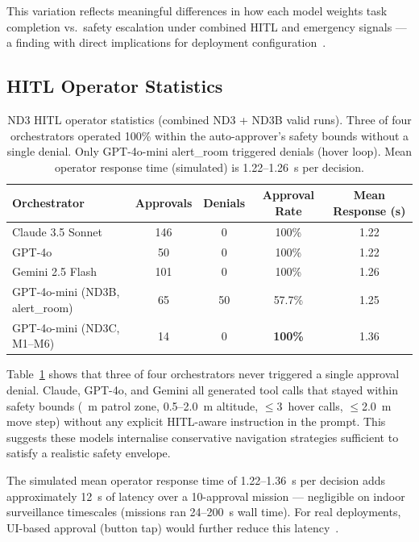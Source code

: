 This variation reflects meaningful differences in how each model weights task completion
vs.\ safety escalation under combined HITL and emergency signals --- a finding with direct
implications for deployment configuration~\cite{kapoor2024aiagents}.

\subsection{HITL Operator Statistics}
\label{sec:ch4_nd3_hitl_stats}

\begin{table}[ht]
  \caption{ND3 HITL operator statistics (combined ND3 + ND3B valid runs).
    Three of four orchestrators operated 100\% within the auto-approver's safety bounds
    without a single denial.  Only GPT-4o-mini alert\_room triggered denials (hover loop).
    Mean operator response time (simulated) is 1.22--1.26~s per decision.}
  \label{tab:ch4_nd3_hitl}
  \centering
  \small
  \begin{tabular}{lcccc}
    \toprule
    Orchestrator & Approvals & Denials & Approval Rate & Mean Response (s) \\
    \midrule
    Claude 3.5 Sonnet & 146 & 0  & 100\% & 1.22 \\
    GPT-4o            & 50  & 0  & 100\% & 1.22 \\
    Gemini 2.5 Flash  & 101 & 0  & 100\% & 1.26 \\
    GPT-4o-mini (ND3B, alert\_room) & 65 & 50 & 57.7\% & 1.25 \\
    GPT-4o-mini (ND3C, M1--M6)     & 14 & 0  & \textbf{100\%} & 1.36 \\
    \bottomrule
  \end{tabular}
\end{table}

Table~\ref{tab:ch4_nd3_hitl} shows that three of four orchestrators never triggered a
single approval denial.  Claude, GPT-4o, and Gemini all generated tool calls that stayed
within safety bounds (~m patrol zone, 0.5--2.0~m altitude, $\leq$3~hover
calls, $\leq$2.0~m move step) without any explicit HITL-aware instruction in the prompt.
This suggests these models internalise conservative navigation strategies sufficient to
satisfy a realistic safety envelope.

The simulated mean operator response time of 1.22--1.36~s per decision adds approximately
12~s of latency over a 10-approval mission --- negligible on indoor surveillance timescales
(missions ran 24--200~s wall time).  For real deployments, UI-based approval (button tap)
would further reduce this latency~\cite{chen2018humanperformance}.

